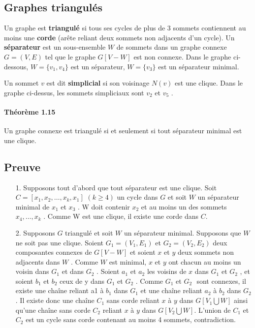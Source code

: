 \subsection{Graphes triangulés}
\noindent Un graphe est \textbf{triangulé} si tous ses cycles de plus de 3 sommets contiennent au moins une
\textbf{corde} (arête reliant deux sommets non adjacents d'un cycle).
Un \textbf{séparateur} est un sous-ensemble $ W $ de sommets dans un graphe connexe $ G = (V, E) $
tel que le graphe $ G[V - W ] $ est non connexe. Dans le graphe ci-dessous, $ W = \{v_{1} , v_{4}\} $ est
un séparateur, $ W = \{v_{3} \}$ est un séparateur minimal.

Un sommet $ v $ est dit \textbf{simplicial} si son voisinage $ N(v) $ est une clique. Dans le graphe ci-dessus, 
les sommets simpliciaux sont $ v_{2} $ et $ v_{5} $ .

\paragraph*{Théorème 1.15}
Un graphe connexe est triangulé si et seulement si tout séparateur minimal est une
clique.

\subsection*{Preuve}
\begin{itemize}
	\item[1.] Supposons tout d'abord que tout séparateur est une clique. Soit $ C = [x_{1} , x_{2}, \dots , x_{k} , x_{1}] $
$ (k \geq 4) $ un cycle dans $ G $ et soit $ W $ un séparateur minimal de $ x_{1} $ et $ x_{3} $ . W doit contenir $ x_{2} $
et au moins un des sommets $ x_{4} ,\dots ,x_{k} $ . Comme W est une clique, il existe une corde
dans $ C $.
\item[2.] Supposons $ G $ triangulé et soit $ W $ un séparateur minimal. Supposons que $ W $ ne soit
pas une clique. Soient $ G_{1} = (V_{1} , E_{1}) $ et $ G_{2} = (V_{2}, E_{2} ) $ deux composantes connexes de
$ G[V-W ] $ et soient $ x $ et $ y $ deux sommets non adjacents dans $ W $ . Comme $ W $ est minimal,
$ x $ et $ y $ ont chacun au moins un voisin dans $ G_{1} $ et dans $ G_{2} $ . Soient $ a_{1} $ et $ a_{2} $ les voisins
de $ x $ dans $ G_{1} $ et $ G_{2} $ , et soient $ b_{1} $ et $ b_{2} $ ceux de y dans $ G_{1} $ et $ G_{2} $ . Comme $ G_{1} $ et $ G_{2}$  $ $
sont connexes, il existe une chaîne reliant a1 à $ b_{1} $ dans $ G_{1} $ et une chaîne reliant $ a_{2} $ à $ b_{2} $
dans $ G_{2} $ . Il existe donc une chaîne $ C_{1} $ sans corde reliant $ x $ à $ y $ dans $ G[V_{1} \bigcup W ] $ ainsi
qu'une chaîne sans corde $ C_{2} $ reliant $ x $ à $ y $ dans $ G[V_{2} \bigcup W ] $. L'union de $ C_{1} $ et $ C_{2} $ est un
cycle sans corde contenant au moins 4 sommets, contradiction.
\end{itemize}

